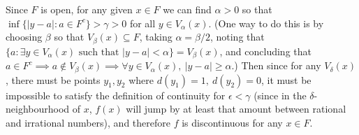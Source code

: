\begin{solution}
{    Since \(F\) is open, for any given \(x \in F\) we can find \(\alpha > 0\) so that \(\inf \{|y - a| : a \in F^c\} > \gamma > 0\) for all \(y \in V_\alpha(x)\). (One way to do this is by choosing \(\beta\) so that \(V_\beta(x) \subseteq F\), taking \(\alpha = \beta / 2\), noting that \(\{a : \exists y \in V_\alpha(x) \text{ such that } |y - a| < \alpha \} = V_\beta(x)\), and concluding that \(a \in F^c \implies a \notin V_\beta(x) \implies \forall y \in V_\alpha(x),\ |y - a| \geq \alpha \).)
    Then since for any \(V_\delta(x)\), there must be points \(y_1, y_2\) where \(d(y_1) = 1,\ d(y_2) = 0\), it must be impossible to satisfy the definition of continuity for \(\epsilon < \gamma\) (since in the \(\delta\)-neighbourhood of \(x\), \(f(x)\) will jump by at least that amount between rational and irrational numbers), and therefore \(f\) is discontinuous for any \(x \in F\).
  }
\end{solution}



